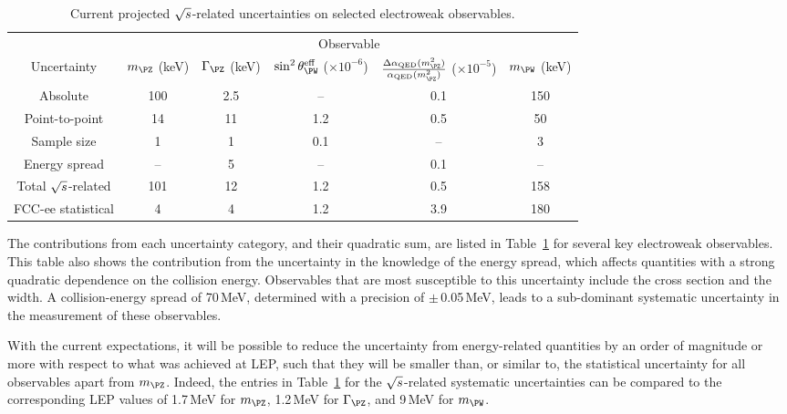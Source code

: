 \begin{table}[h]
\centering
\caption{Current projected $\sqrt{s}$-related uncertainties on selected electroweak observables.}  
\label{tab:DS-Ecal-errors-final}
\begin{tabular}{cccccc} \toprule
    & \multicolumn{5}{c}{Observable} \\
    Uncertainty 
    & $m_{\PZ}$ (keV) & $\Gamma_{\PZ}$ (keV) 
    &  $\sin^2 \theta^\text{eff}_{\PW}$ ($\times 10^{-6}$) 
    & $\frac{\Delta \alpha_\text{QED}(m^2_{\PZ})}{\alpha_\text{QED}(m^2_{\PZ})}$ ($\times 10^{-5}$) 
    & $m_{\PW}$ (keV) \\ 
\midrule
    Absolute & 100 & 2.5 & -- & 0.1 & 150 \\
    Point-to-point & 14 & 11 & 1.2 & 0.5 & 50 \\
    Sample size & 1 & 1 & 0.1 & -- & 3 \\
    Energy spread & -- & 5 & -- & 0.1 & -- \\ 
\midrule
    Total $\sqrt{s}$-related & 101 & 12 & 1.2 & 0.5 & 158 \\ 
\midrule
    FCC-ee statistical & 4 & 4 & 1.2 & 3.9 & 180 \\  
\bottomrule
\end{tabular}
\end{table}

The contributions from each uncertainty category, and their quadratic sum, are listed in Table~\ref{tab:DS-Ecal-errors-final} for several key electroweak observables.
This table also shows the contribution from the uncertainty in the knowledge of the energy spread, which affects quantities with a strong quadratic dependence on the collision energy.  
Observables that are most susceptible to this uncertainty include the \PZ cross section and the \PZ width.  
A collision-energy spread of 70\,MeV, determined with a precision of $\pm$\,0.05\,MeV, leads to a sub-dominant systematic uncertainty in the measurement of these observables.

With the current expectations, it will be possible to reduce the uncertainty from energy-related quantities by an order of magnitude or more with respect to what was achieved at LEP, such that they will be smaller than, or similar to, the statistical uncertainty for all observables apart from $m_{\PZ}$.  
Indeed, the entries in Table~\ref{tab:DS-Ecal-errors-final} for the $\sqrt{s}$-related systematic uncertainties can be compared to the corresponding LEP values of 
1.7\,MeV for $m_{\PZ}$, 1.2\,MeV for $\Gamma_{\PZ}$, and 9\,MeV for $m_{\PW}$. 

